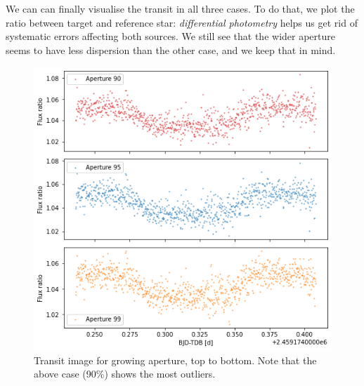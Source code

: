 \documentclass[a4paper,11pt,twocolumn]{article}
\begin{document}
We can can finally visualise the transit in all three cases. To do that, we 
plot the ratio between target and reference star: \textit{differential 
photometry} helps us get rid of systematic errors affecting both sources.
We still see that the wider aperture seems to have less dispersion than 
the other case, and we keep that in mind.
\begin{figure}
    \centering
    \includegraphics[scale=0.5, angle=0]{../pictures/taste/transits.png}
    \caption{Transit image for growing aperture, top to bottom. Note that 
    the above case (90\%) shows the most outliers.}
    \label{fig:transits}
\end{figure}
\end{document}
